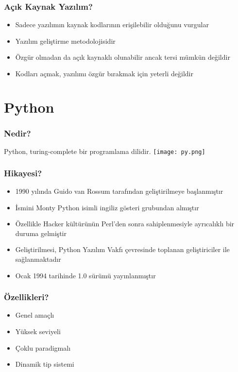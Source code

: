 \documentclass[10pt, compress]{beamer}
\begin{document}
\begin{frame}[fragile]
    \frametitle{Açık Kaynak Yazılım?}
    \begin{itemize}[<+- | alert@+>]
        \item Sadece yazılımın kaynak kodlarının erişilebilir olduğunu vurgular
        \item Yazılım geliştirme metodolojisidir
        \item Özgür olmadan da açık kaynaklı olunabilir ancak tersi mümkün değildir
        \item Kodları açmak, yazılımı özgür bırakmak için yeterli değildir
    \end{itemize}  
\end{frame}


\section{Python}

\begin{frame}[fragile]
  \frametitle{Nedir?}
  \begin{center}
  Python, turing-complete bir programlama dilidir.
  \texttt{[image: py.png]}
  \end{center}
\end{frame}


\begin{frame}[fragile]
    \frametitle{Hikayesi?}
    \begin{itemize}[<+- | alert@+>]
        \item 1990 yılında Guido van Rossum tarafından geliştirilmeye başlanmıştır
        \item İsmini Monty Python isimli ingiliz gösteri grubundan almıştır
        \item Özellikle Hacker kültürünün Perl'den sonra sahiplenmesiyle ayrıcalıklı bir duruma gelmiştir
        \item Geliştirilmesi, Python Yazılım Vakfı çevresinde toplanan geliştiriciler ile sağlanmaktadır
        \item Ocak 1994 tarihinde 1.0 sürümü yayınlanmıştır
    \end{itemize}  
\end{frame}

\begin{frame}[fragile]
    \frametitle{Özellikleri?}
    \begin{itemize}[<+- | alert@+>]
        \item Genel amaçlı
        \item Yüksek seviyeli
        \item Çoklu paradigmalı
        \item Dinamik tip sistemi
    \end{itemize}  
\end{frame}
\end{document}
